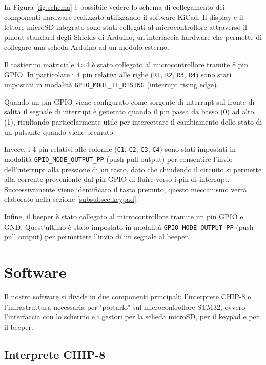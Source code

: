 \documentclass[a4paper]{article}
\begin{document}
In Figura \ref{fig:schema} è possibile vedere lo schema di collegamento
dei componenti hardware realizzato utilizzando il software KiCad.
Il display e il lettore microSD integrato sono stati collegati al microcontrollore
attraverso il pinout standard degli Shields di Arduino, un'interfaccia hardware che permette
di collegare una scheda Arduino ad un modulo esterno.

Il tastierino matriciale 4$\times$4 è stato collegato al microcontrollore tramite 8 pin GPIO.
In particolare i 4 pin relativi alle righe (\texttt{R1}, \texttt{R2}, \texttt{R3}, \texttt{R4})
sono stati impostati in modalità \texttt{GPIO\_MODE\_IT\_RISING} (interrupt rising edge).

Quando un pin GPIO viene configurato come sorgente di interrupt sul fronte di salita
il segnale di interrupt è generato quando il pin passa da basso (0) ad alto (1), risultando
particolarmente utile per intercettare il cambiamento dello stato di un
pulsante quando viene premuto.

Invece, i 4 pin relativi alle colonne (\texttt{C1}, \texttt{C2}, \texttt{C3}, \texttt{C4})
sono stati impostati in modalità \texttt{GPIO\_MODE\_OUTPUT\_PP} (push-pull output) per
consentire l'invio dell'interrupt alla pressione di un tasto, dato che chiudendo il circuito
si permette alla corrente proveniente dal pin GPIO di fluire verso i pin di interrupt.
Successivamente viene identificato il tasto premuto, questo meccanismo verrà elaborato
nella sezione \ref{subsubsec:keypad}.

\clearpage

Infine, il beeper è stato collegato al microcontrollore tramite un pin GPIO e GND.
Quest'ultimo è stato impostato in modalità \texttt{GPIO\_MODE\_OUTPUT\_PP} (push-pull output)
per permettere l'invio di un segnale al beeper.

\section{Software}

Il nostro software si divide in due componenti principali: l'interprete CHIP-8 e
l'infrastruttura necessaria per "portarlo" sul microcontrollore STM32, ovvero l'interfaccia
con lo schermo e i gestori per la scheda microSD, per il keypad e per il beeper.

\subsection{Interprete CHIP-8} \label{subsec:intreprete}
\end{document}
